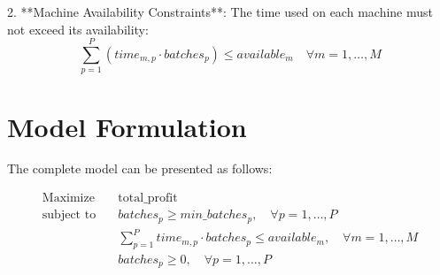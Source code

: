 \documentclass{article}
\begin{document}
2. **Machine Availability Constraints**:
   The time used on each machine must not exceed its availability:
   \[
   \sum_{p=1}^{P} \left( time_{m,p} \cdot batches_p \right) \leq available_m \quad \forall m = 1, \ldots, M
   \]

\section*{Model Formulation}

The complete model can be presented as follows:

\[
\begin{aligned}
\text{Maximize} \quad & \text{total\_profit} \\
\text{subject to} \quad & batches_p \geq min\_batches_p, \quad \forall p = 1, \ldots, P \\
& \sum_{p=1}^{P} time_{m,p} \cdot batches_p \leq available_m, \quad \forall m = 1, \ldots, M \\
& batches_p \geq 0, \quad \forall p = 1, \ldots, P
\end{aligned}
\]
\end{document}
